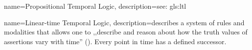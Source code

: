 {
    name={Propositional Temporal Logic},
    description={see: \gls{gls:ltl}}
}

{
    name={Linear-time Temporal Logic},
    description={describes a system of rules and modalities that allows one to ,,describe and reason about how the truth values of assertions vary
with time'' (\cite{emerson1990temporal}). Every point in time has a defined successor.}
}
